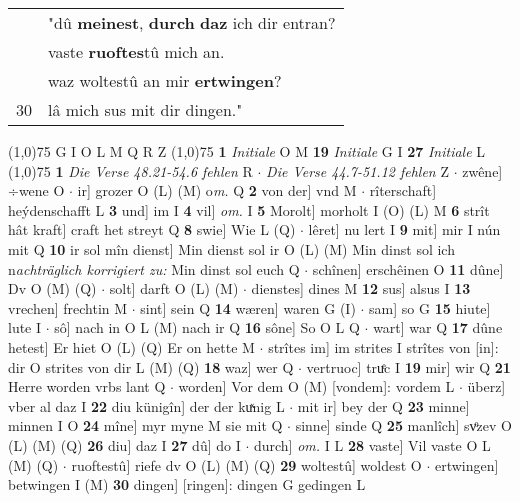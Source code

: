 \documentclass[8pt,a4paper,notitlepage]{article}
\begin{document}
\begin{table}[ht]
\begin{minipage}[t]{0.5\linewidth}
\begin{tabular}{rl}
 & "dû \textbf{meinest}, \textbf{durch} \textbf{daz} ich dir entran?\\ 
 & vaste \textbf{ruoftes}tû mich an.\\ 
 & waz woltestû an mir \textbf{ertwingen}?\\ 
30 & lâ mich sus mit dir dingen."\\ 
\end{tabular}
\scriptsize
\line(1,0){75} \newline
G I O L M Q R Z \newline
\line(1,0){75} \newline
\textbf{1} \textit{Initiale} O M  \textbf{19} \textit{Initiale} G I  \textbf{27} \textit{Initiale} L  \newline
\line(1,0){75} \newline
\textbf{1} \textit{Die Verse 48.21-54.6 fehlen} R   $\cdot$ \textit{Die Verse 44.7-51.12 fehlen} Z   $\cdot$ zwêne] ÷wene O  $\cdot$ ir] grozer O (L) (M) o\textit{m. } Q \textbf{2} von der] vnd M  $\cdot$ rîterschaft] heýdenschafft L \textbf{3} und] im I \textbf{4} vil] \textit{om.} I \textbf{5} Morolt] morholt I (O) (L) M \textbf{6} strît hât kraft] craft het streyt Q \textbf{8} swie] Wie L (Q)  $\cdot$ lêret] nu lert I \textbf{9} mit] mir I nún mit Q \textbf{10} ir sol mîn dienst] Min dienst sol ir O (L) (M) Min dinst sol ich n\textit{achträglich korrigiert zu: }Min dinst sol euch Q  $\cdot$ schînen] erschêinen O \textbf{11} dûne] Dv O (M) (Q)  $\cdot$ solt] darft O (L) (M)  $\cdot$ dienstes] dines M \textbf{12} sus] alsus I \textbf{13} vrechen] frechtin M  $\cdot$ sint] sein Q \textbf{14} wæren] waren G (I)  $\cdot$ sam] so G \textbf{15} hiute] lute I  $\cdot$ sô] nach in O L (M) nach ir Q \textbf{16} sône] So O L Q  $\cdot$ wart] war Q \textbf{17} dûne hetest] Er hiet O (L) (Q) Er on hette M  $\cdot$ strîtes im] im strites I strîtes von [in]: dir O strites von dir L (M) (Q) \textbf{18} waz] wer Q  $\cdot$ vertruoc] truͤc I \textbf{19} mir] wir Q \textbf{21} Herre worden vrbs lant Q  $\cdot$ worden] Vor dem O (M) [vondem]: vordem  L  $\cdot$ überz] vber al daz I \textbf{22} diu künigîn] der der kuͯnig L  $\cdot$ mit ir] bey der Q \textbf{23} minne] minnen I O \textbf{24} mîne] myr myne M sie mit Q  $\cdot$ sinne] sinde Q \textbf{25} manlîch] svͦzev O (L) (M) (Q) \textbf{26} diu] daz I \textbf{27} dû] do I  $\cdot$ durch] \textit{om.} I L \textbf{28} vaste] Vil vaste O L (M) (Q)  $\cdot$ ruoftestû] riefe dv O (L) (M) (Q) \textbf{29} woltestû] woldest O  $\cdot$ ertwingen] betwingen I (M) \textbf{30} dingen] [ringen]: dingen G gedingen L \newline

\end{minipage}
\end{table}
\end{document}
